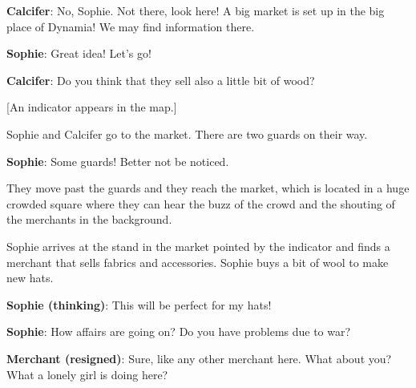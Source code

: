\textbf{Calcifer}: No, Sophie. Not there, look here! A big market is set up in the big place of Dynamia! We may find information there.

\textbf{Sophie}: Great idea! Let's go!

\textbf{Calcifer}: Do you think that they sell also a little bit of wood?

[An indicator appears in the map.]

Sophie and Calcifer go to the market. There are two guards on their way.

\textbf{Sophie}: Some guards! Better not be noticed.

They move past the guards and they reach the market, which is located in a huge crowded square where they can hear the buzz of the crowd and the shouting of the merchants in the background.


Sophie arrives at the stand in the market pointed by the indicator and finds a merchant that sells fabrics and accessories.
Sophie buys a bit of wool to make new hats.

\textbf{Sophie (thinking)}: This will be perfect for my hats!

\textbf{Sophie}: How affairs are going on? Do you have problems due to war?

\textbf{Merchant (resigned)}: Sure, like any other merchant here. What about you? What a lonely girl is doing here?

